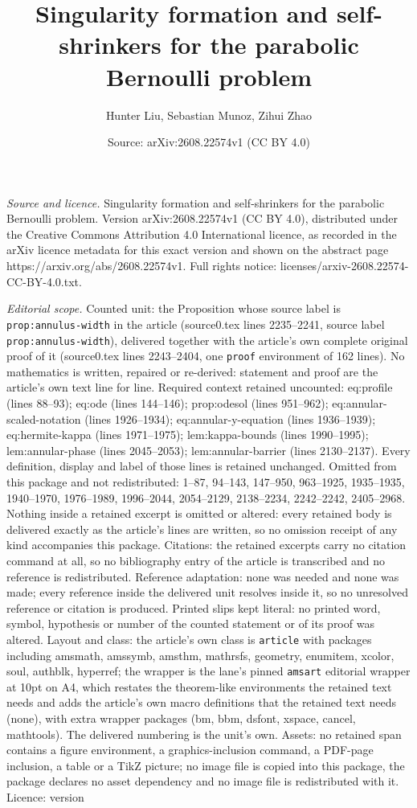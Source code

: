 \documentclass[10pt,a4paper]{amsart}
\title[Singularity formation and self-shrinkers for the parabolic B]{Singularity formation and self-shrinkers for the parabolic Bernoulli problem}
\author{Hunter Liu, Sebastian Munoz, Zihui Zhao}
\date{Source: arXiv:2608.22574v1 (CC BY 4.0)}
\begin{document}
\maketitle

\noindent\emph{Source and licence.} Singularity formation and self-shrinkers for the parabolic Bernoulli problem. Version arXiv:2608.22574v1 (CC BY 4.0), distributed under the Creative Commons Attribution 4.0 International licence, as recorded in the arXiv licence metadata for this exact version and shown on the abstract page https://arxiv.org/abs/2608.22574v1. Full rights notice: licenses/arxiv-2608.22574-CC-BY-4.0.txt.\par\smallskip

\noindent\textit{Editorial scope.} Counted unit: the Proposition whose source label is \texttt{prop:annulus-width} in the article (source0.tex lines 2235--2241, source label \texttt{prop:annulus-width}), delivered together with the article's own complete original proof of it (source0.tex lines 2243--2404, one \texttt{proof} environment of 162 lines). No mathematics is written, repaired or re-derived: statement and proof are the article's own text line for line. Required context retained uncounted: eq:profile (lines 88--93); eq:ode (lines 144--146); prop:odesol (lines 951--962); eq:annular-scaled-notation (lines 1926--1934); eq:annular-y-equation (lines 1936--1939); eq:hermite-kappa (lines 1971--1975); lem:kappa-bounds (lines 1990--1995); lem:annular-phase (lines 2045--2053); lem:annular-barrier (lines 2130--2137). Every definition, display and label of those lines is retained unchanged. Omitted from this package and not redistributed: 1--87, 94--143, 147--950, 963--1925, 1935--1935, 1940--1970, 1976--1989, 1996--2044, 2054--2129, 2138--2234, 2242--2242, 2405--2968. Nothing inside a retained excerpt is omitted or altered: every retained body is delivered exactly as the article's lines are written, so no omission receipt of any kind accompanies this package. Citations: the retained excerpts carry no citation command at all, so no bibliography entry of the article is transcribed and no reference is redistributed. Reference adaptation: none was needed and none was made; every reference inside the delivered unit resolves inside it, so no unresolved reference or citation is produced. Printed slips kept literal: no printed word, symbol, hypothesis or number of the counted statement or of its proof was altered. Layout and class: the article's own class is \texttt{article} with packages including amsmath, amssymb, amsthm, mathrsfs, geometry, enumitem, xcolor, soul, authblk, hyperref; the wrapper is the lane's pinned \texttt{amsart} editorial wrapper at 10pt on A4, which restates the theorem-like environments the retained text needs and adds the article's own macro definitions that the retained text needs (none), with extra wrapper packages (bm, bbm, dsfont, xspace, cancel, mathtools). The delivered numbering is the unit's own. Assets: no retained span contains a figure environment, a graphics-inclusion command, a PDF-page inclusion, a table or a TikZ picture; no image file is copied into this package, the package declares no asset dependency and no image file is redistributed with it. Licence: version 
\end{document}
